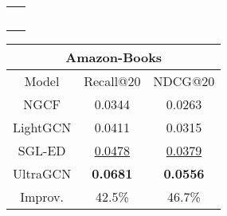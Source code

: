 \documentclass[sigconf,authorversion]{acmart}
\begin{document}
\begin{table}[H]
\begin{tabular}{c}
~\vspace{0ex}
\end{tabular}

\begin{tabular}{ccc}
\hline
\multicolumn{3}{c}{Amazon-Books}               \\ \hline
Model    & Recall@20       & NDCG@20         \\ \hline
NGCF     & 0.0344          & 0.0263          \\
LightGCN  & 0.0411          & 0.0315          \\
SGL-ED     & \underline{0.0478}         & \underline{0.0379}          \\ \hline
UltraGCN & \textbf{0.0681} & \textbf{0.0556} \\
Improv.  & 42.5\%           & 46.7\%          \\ \hline
\end{tabular}


\end{table}







 
\balance



\end{document}
